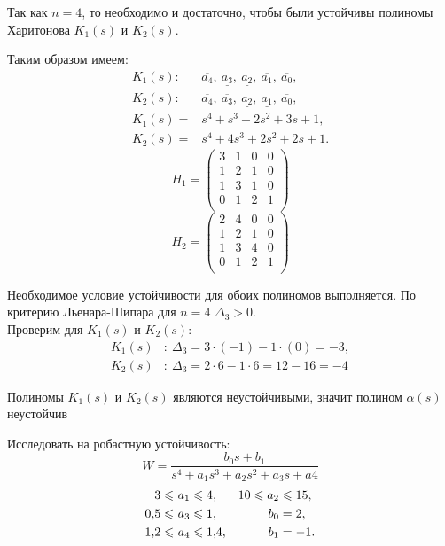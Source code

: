 \documentclass[../../TAU.tex]{subfiles}
\begin{document}
    Так как $n=4$, то необходимо и достаточно, чтобы были устойчивы полиномы Харитонова 
    ${K}_1(s)$ и ${K}_2(s)$.

    Таким образом имеем:
    \begin{align*}
        {K}_1(s):\ &\overline{a_4},\ \underline{a_3},\ \underline{a_2},\ \overline{a_1},\ \overline{a_0},\\
        {K}_2(s):\ &\overline{a_4},\ \overline{a_3},\ \underline{a_2},\ \underline{a_1},\ \overline{a_0},\\
        {K}_1(s)= &s^4+s^3+2s^2+3s+1,\\
        {K}_2(s)= &s^4+4s^3+2s^2+2s+1.
    \end{align*}
    $$
        H_1=
        \begin{pmatrix}
            3 & 1 & 0 & 0 \\
            1 & 2 & 1 & 0 \\
            1 & 3 & 1 & 0 \\
            0 & 1 & 2 & 1 \\
        \end{pmatrix}
    $$
    $$
        H_2=
        \begin{pmatrix}
            2 & 4 & 0 & 0 \\
            1 & 2 & 1 & 0 \\
            1 & 3 & 4 & 0 \\
            0 & 1 & 2 & 1 \\
        \end{pmatrix}
    $$

    Необходимое условие устойчивости для обоих полиномов выполняется. По критерию Льенара-Шипара для $n=4$ $\Delta_3>0$.\\
    Проверим для ${K}_1(s)$ и ${K}_2(s)$:
    \begin{align*}
        {K}_1(s)&:\ \Delta_3=3\cdot(-1)-1\cdot(0)=-3,\\
        {K}_2(s)&:\ \Delta_3=2\cdot6-1\cdot6=12-16=-4
    \end{align*}

    Полиномы ${K}_1(s)$ и ${K}_2(s)$ являются неустойчивыми, значит полином $\alpha(s)$ неустойчив

    \examp Исследовать на робастную устойчивость:
    $$
    W=\frac{b_0s+b_1}{s^4+a_1s^3+a_2s^2+a_3s+a4}
    $$
    \begin{align*}
        3\leqslant\ &a_1\leqslant4, & 10\leqslant a_2&\leqslant15, \\
        0{,}5\leqslant\ &a_3\leqslant1, & b_0&=2, \\
        1{,}2\leqslant\ &a_4\leqslant1{,}4, & b_1&=-1.
    \end{align*}
\end{document}
